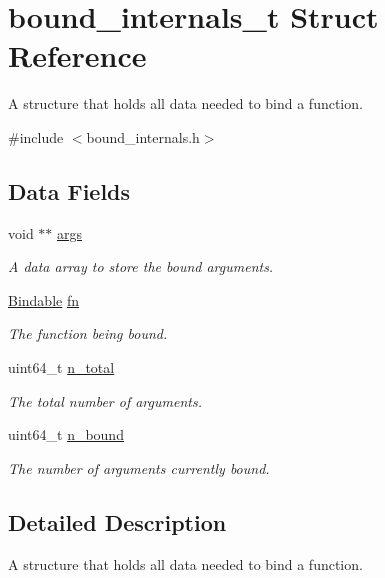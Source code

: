 \hypertarget{structbound__internals__t}{}\section{bound\+\_\+internals\+\_\+t Struct Reference}
\label{structbound__internals__t}


A structure that holds all data needed to bind a function.  




{\ttfamily \#include $<$bound\+\_\+internals.\+h$>$}

\subsection*{Data Fields}
\begin{DoxyCompactItemize}
\item 
void $\ast$$\ast$ \hyperlink{structbound__internals__t_a1dcd077e48f2a5b381de1b03fed7c8eb}{args}
\begin{DoxyCompactList}\small\item\em A data array to store the bound arguments. \end{DoxyCompactList}\item 
\hyperlink{bind__defs_8h_a48106166e38fd5a82b69958273087c84}{Bindable} \hyperlink{structbound__internals__t_ac9b29b4f9b69674cef9fb3d083b92521}{fn}
\begin{DoxyCompactList}\small\item\em The function being bound. \end{DoxyCompactList}\item 
uint64\+\_\+t \hyperlink{structbound__internals__t_a804e2e3c6b4c0ca1814c6884ed0bd161}{n\+\_\+total}
\begin{DoxyCompactList}\small\item\em The total number of arguments. \end{DoxyCompactList}\item 
uint64\+\_\+t \hyperlink{structbound__internals__t_aa959691320a507b149ff25164740a323}{n\+\_\+bound}
\begin{DoxyCompactList}\small\item\em The number of arguments currently bound. \end{DoxyCompactList}\end{DoxyCompactItemize}


\subsection{Detailed Description}
A structure that holds all data needed to bind a function. 

